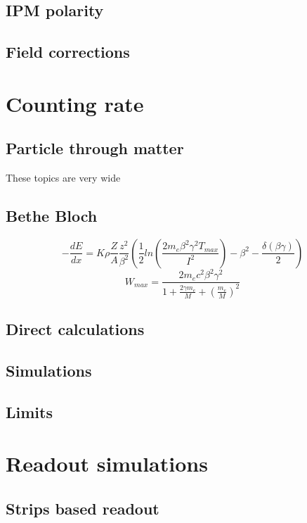 \begin{refsection}
	\subsection{IPM polarity}
	\subsection{Field corrections}

	\section{Counting rate}
	\subsection{Particle through matter}

	These topics are very wide
	\subsection{Bethe Bloch}
	\begin{equation}
		-\frac{dE}{dx}=K \rho \frac{Z}{A} \frac{z^{2}}{\beta^{2}} \left(\frac{1}{2} ln \left(\frac{2 m_{e} \beta^{2} \gamma^{2} T_{max}}{I^{2}} \right) - \beta^{2} - \frac{\delta(\beta \gamma)}{2} \right)
	\end{equation}
	\begin{equation}
		W_{max} = \frac{2 m_{e} c^{2} \beta^{2} \gamma^{2}}{1 + \frac{2 \gamma m_{e} }{M} + \left( \frac{m_{e}}{M} \right)^{2}}
	\end{equation}
	\subsection{Direct calculations}
	
	\subsection{Simulations}
	\subsection{Limits}

	\section{Readout simulations}
	\subsection{Strips based readout}

\end{refsection}
